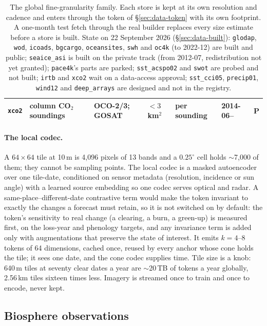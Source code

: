\documentclass[10pt]{article}
\newcommand{\code}[1]{\texttt{#1}}
\begin{document}
\begin{table}[t]
\begin{tabular}{@{}L{1.6cm}L{4.1cm}L{2.2cm}L{1.9cm}L{1.9cm}L{2.0cm}c@{}}
\code{xco2} & column CO$_2$ soundings & OCO-2/3; GOSAT & $<3$\,km$^2$ & per sounding & 2014-06-- & P \\
\bottomrule
\end{tabular}
\caption{The global fine-granularity family. Each store is kept at its own
resolution and cadence and enters through the token of
\S\ref{sec:data-token} with its own footprint. A one-month test fetch
through the real builder replaces every size estimate before a store is
built. State on 22 September 2026 (\S\ref{sec:data-built}): \code{glodap},
\code{wod}, \code{icoads}, \code{bgcargo}, \code{oceansites}, \code{swh} and
\code{oc4k} (to 2022-12) are built and public; \code{seaice\_asi} is built on
the private track (from 2012-07, redistribution not yet granted);
\code{pace4k}'s parts are parked; \code{sst\_acspo02} and \code{swot} are
probed and not built; \code{irtb} and \code{xco2} wait on a data-access
approval; \code{sst\_cci05}, \code{precip01}, \code{wind12} and
\code{deep\_arrays} are designed and not in the registry.\label{tab:gf}}
\end{table}

\paragraph{The local codec.} A $64\times64$ tile at 10\,m is 4{,}096 pixels
of 13 bands and a $0.25^\circ$ cell holds ${\sim}$7{,}000 of them; they
cannot be sampling points. The local codec is a masked autoencoder over one
tile-date, conditioned on sensor metadata (resolution, incidence or sun
angle) with a learned source embedding so one codec serves optical and
radar. A same-place--different-date contrastive term would make the token
invariant to exactly the changes a forecast must retain, so it is not
switched on by default: the token's sensitivity to real change (a
clearing, a burn, a green-up) is measured first, on the loss-year and
phenology targets, and any invariance term is added only with augmentations
that preserve the state of interest. It emits $k=4$--$8$ tokens of 64 dimensions,
cached once, reused by every anchor whose cone holds the tile; it sees one
date, and the cone codec supplies time. Tile size is a knob: 640\,m tiles at
seventy clear dates a year are ${\sim}$20\,TB of tokens a year globally,
2.56\,km tiles sixteen times less. Imagery is streamed once to train and once
to encode, never kept.

\subsection{Biosphere observations}\label{sec:data-bio}
\end{document}

